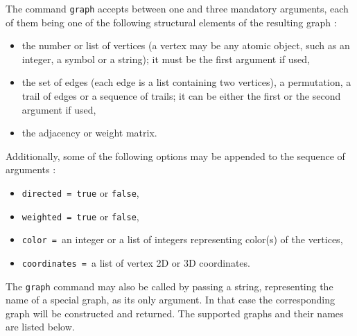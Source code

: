 \documentclass[a4paper,11pt]{article}
\begin{document}
The command {\tt graph} accepts between one and three mandatory arguments, each of them being one of the following structural elements of the resulting graph :
\begin{itemize}
  \item the number or list of vertices (a vertex may be any atomic object, such as an integer, a symbol or a string); it must be the first argument if used,
  \item the set of edges (each edge is a list containing two vertices), a permutation, a trail of edges or a sequence of trails; it can be either the first or the second argument if used,
  \item the adjacency or weight matrix.
\end{itemize}
Additionally, some of the following options may be appended to the sequence of arguments :
\begin{itemize}
  \item {\tt directed = true} or {\tt false},
  \item {\tt weighted = true} or {\tt false},
  \item {\tt color = }an integer or a list of integers representing color(s) of the vertices,
  \item {\tt coordinates = }a list of vertex 2D or 3D coordinates.
\end{itemize}
The {\tt graph} command may also be called by passing a string, representing the name of a special graph, as its only argument. In that case the corresponding graph will be constructed and returned. The supported graphs and their names are listed below.
\end{document}

